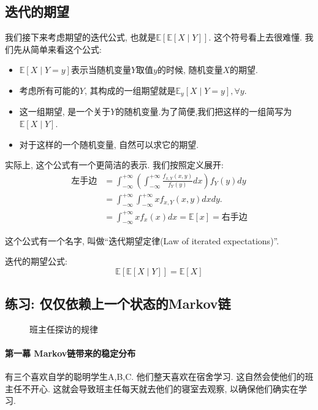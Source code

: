     \subsection{迭代的期望}

    我们接下来考虑期望的迭代公式, 也就是$\mathbb{E}[\mathbb{E}[X \mid Y]]$. 这个符号看上去很难懂. 我们先从简单来看这个公式: 
    \begin{itemize}
        \item $\mathbb{E}[X \mid Y=y]$表示当随机变量$Y$取值$y$的时候, 随机变量$X$的期望. 
        \item 考虑所有可能的$Y$, 其构成的一组期望就是$\mathbb{E}_y[X \mid Y=y], \forall y$. 
        \item 这一组期望, 是一个关于$Y$的随机变量.为了简便,我们把这样的一组简写为$\mathbb{E}[X \mid Y]$.
        \item 对于这样的一个随机变量, 自然可以求它的期望. 
    \end{itemize}

    实际上, 这个公式有一个更简洁的表示. 我们按照定义展开: 
    $$\begin{aligned} \text{左手边} & =\int_{-\infty}^{+\infty}\left(\int_{-\infty}^{+\infty} \frac{f_{x, Y}(x, y)}{f_Y(y)} d x\right) f_Y(y) d y \\ & =\int_{-\infty}^{+\infty} \int_{-\infty}^{+\infty} x f_{x, Y}(x, y) d x d y . \\ & =\int_{-\infty}^{+\infty} x f_x(x) d x=\mathbb{E}[x]=\text{右手边}\end{aligned}$$

    这个公式有一个名字, 叫做``迭代期望定律(Law of iterated expectations)''. 

    \begin{theorem}
        迭代的期望公式:$$
\mathbb{E}[{\mathbb{E}}[X \mid Y]]=\mathbb{E}[X]
$$
    \end{theorem}

    \subsection{练习: 仅仅依赖上一个状态的Markov链}

        \begin{wrapfigure}{l}{0.4\textwidth}
        \begin{center}
            
        \end{center}
        \caption{班主任探访的规律}
        \label{fig:meeting-supervisor-pattern}
    \end{wrapfigure}
    \paragraph{第一幕 Markov链带来的稳定分布} 有三个喜欢自学的聪明学生A,B,C. 他们整天喜欢在宿舍学习. 这自然会使他们的班主任不开心. 这就会导致班主任每天就去他们的寝室去观察, 以确保他们确实在学习. 
    
